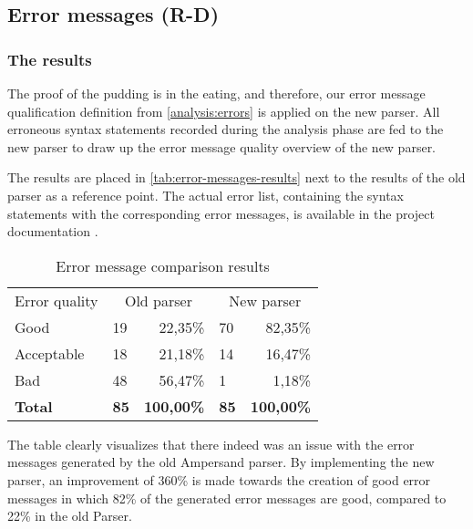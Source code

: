 
\subsection{Error messages  (R-D)}
\label{design:errors}

\subsubsection{The results}
The proof of the pudding is in the eating, and therefore, our error message qualification definition from \autoref{analysis:errors} is applied on the new parser.
All erroneous syntax statements recorded during the analysis phase are fed to the new parser to draw up the error message quality overview of the new parser.

The results are placed in \autoref{tab:error-messages-results} next to the results of the old parser as a reference point.
The actual error list, containing the syntax statements with the corresponding error messages, is available in the project documentation .

\begin{table}[h]
  \centering
	\begin{tabular}{llrlr}
    Error quality  & \multicolumn{2}{c}{Old parser} & \multicolumn{2}{c}{New parser} \\
		Good           & 19          & 22,35\%          & 70          & 82,35\%          \\
		Acceptable        & 18          & 21,18\%          & 14          & 16,47\%          \\
		Bad            & 48          & 56,47\%          & 1           &  1,18\%          \\
		\rowcolor[HTML]{BBBBBB}
		\textbf{Total} & \textbf{85} & \textbf{100,00\%} & \textbf{85} & \textbf{100,00\%}
	\end{tabular}
  \caption{Error message comparison results}
  \label{tab:error-messages-results}
\end{table}

The table clearly visualizes that there indeed was an issue with the error messages generated by the old Ampersand parser.
By implementing the new parser, an improvement of 360\% is made towards the creation of good error messages in which 82\% of the generated error messages are good, compared to 22\% in the old Parser.

